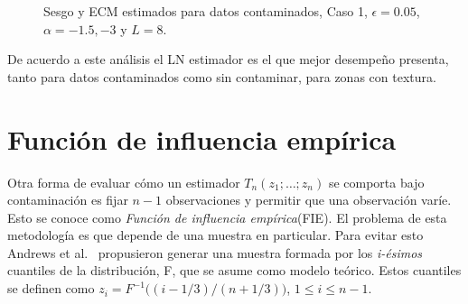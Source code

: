 \begin{figure}[htb]
	\caption{\label{SesgoyECMConContL=8-1punto5y-3}\small Sesgo y ECM estimados para datos contaminados, Caso 1, $\epsilon=0.05$, $\alpha=-1.5, -3$ y $ L=8$.}
\end{figure}
De acuerdo a este análisis el LN estimador es el que mejor desempeño presenta, tanto para datos contaminados como sin contaminar, para zonas con textura.

\section{Función de influencia empírica}
\label{FIES}

Otra forma de evaluar cómo un estimador $T_n(z_1; \ldots ; z_n)$ se comporta bajo contaminación es fijar $n-1$ observaciones y permitir que una observación varíe. Esto se conoce como \textit{Función de influencia empírica}(FIE). El problema de esta metodología es que depende de una muestra en particular. Para evitar esto Andrews et al.~\cite{Andrews1972} propusieron generar una muestra formada por los \textit{i-ésimos} cuantiles de la distribución, F, que se asume como modelo teórico. Estos cuantiles se definen como $z_i=F^{-1}\big((i-1/3)/(n+1/3) \big)$, $1\leq i\leq n-1$.


